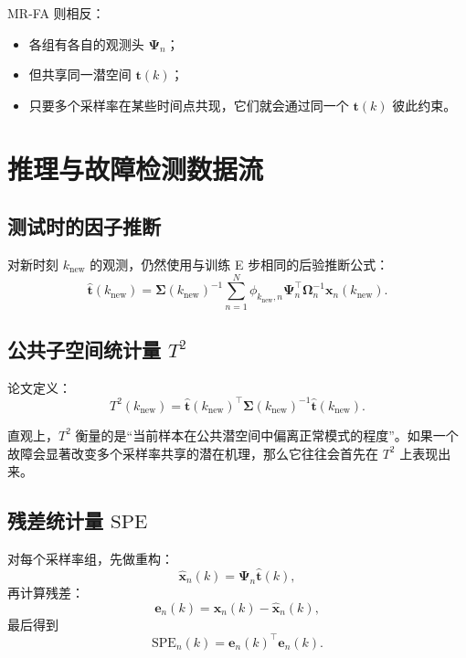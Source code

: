 \documentclass[UTF8]{ctexart}
\begin{document}
MR-FA 则相反：
\begin{itemize}
    \item 各组有各自的观测头 $\bm{\Psi}_n$；
    \item 但共享同一潜空间 $\bm{t}(k)$；
    \item 只要多个采样率在某些时间点共现，它们就会通过同一个 $\bm{t}(k)$ 彼此约束。
\end{itemize}

\section{推理与故障检测数据流}

\subsection{测试时的因子推断}

对新时刻 $k_{\text{new}}$ 的观测，仍然使用与训练 E 步相同的后验推断公式：
\begin{equation}
    \hat{\bm{t}}(k_{\text{new}})
    =
    \bm{\Sigma}(k_{\text{new}})^{-1}
    \sum_{n=1}^{N}
    \phi_{k_{\text{new}},n}
    \bm{\Psi}_n^\top \bm{\Omega}_n^{-1}\bm{x}_n(k_{\text{new}}).
\end{equation}

\subsection{公共子空间统计量 $T^2$}

论文定义：
\begin{equation}
    T^2(k_{\text{new}})
    =
    \hat{\bm{t}}(k_{\text{new}})^\top
    \bm{\Sigma}(k_{\text{new}})^{-1}
    \hat{\bm{t}}(k_{\text{new}}).
\end{equation}

直观上，$T^2$ 衡量的是“当前样本在公共潜空间中偏离正常模式的程度”。如果一个故障会显著改变多个采样率共享的潜在机理，那么它往往会首先在 $T^2$ 上表现出来。

\subsection{残差统计量 $\mathrm{SPE}$}

对每个采样率组，先做重构：
\begin{equation}
    \hat{\bm{x}}_n(k) = \bm{\Psi}_n \hat{\bm{t}}(k),
\end{equation}
再计算残差：
\begin{equation}
    \bm{e}_n(k) = \bm{x}_n(k) - \hat{\bm{x}}_n(k),
\end{equation}
最后得到
\begin{equation}
    \mathrm{SPE}_n(k) = \bm{e}_n(k)^\top \bm{e}_n(k).
\end{equation}
\end{document}
